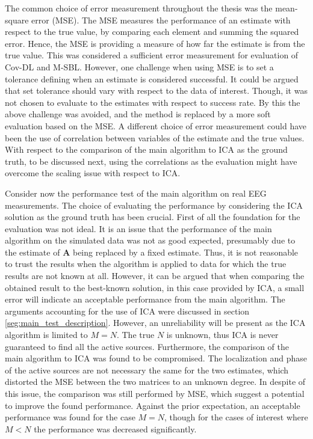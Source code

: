 The common choice of error measurement throughout the thesis was the mean-square error (MSE). 
The MSE measures the performance of an estimate with respect to the true value, by comparing each element and summing the squared error. 
Hence, the MSE is providing a measure of how far the estimate is from the true value. 
This was considered a sufficient error measurement for evaluation of Cov-DL and M-SBL.
However, one challenge when using MSE is to set a tolerance defining when an estimate is considered successful. 
It could be argued that set tolerance should vary with respect to the data of interest.
Though, it was not chosen to evaluate to the estimates with respect to success rate. By this the above challenge was avoided, and the method is replaced by a more soft evaluation based on the MSE. 
A different choice of error measurement could have been the use of correlation between variables of the estimate and the true values. With respect to the comparison of the main algorithm to ICA as the ground truth, to be discussed next, using the correlations as the evaluation might have overcome the scaling issue with respect to ICA.    

Consider now the performance test of the main algorithm on real EEG measurements. 
The choice of evaluating the performance by considering the ICA solution as the ground truth has been crucial. 
First of all the foundation for the evaluation was not ideal. 
It is an issue that the performance of the main algorithm on the simulated data was not as good expected, presumably due to the estimate of $\mathbf{A}$ being replaced by a fixed estimate. 
Thus, it is not reasonable to trust the results when the algorithm is applied to data for which the true results are not known at all. 
However, it can be argued that when comparing the obtained result to the best-known solution, in this case provided by ICA, a small error will indicate an acceptable performance from the main algorithm. 
The arguments accounting for the use of ICA were discussed in section \ref{seg:main_test_description}. 
However, an unreliability will be present as the ICA algorithm is limited to $M = N$. 
The true $N$ is unknown, thus ICA is never guaranteed to find all the active sources.
Furthermore, the comparison of the main algorithm to ICA was found to be compromised. 
The localization and phase of the active sources are not necessary the same for the two estimates, which distorted the MSE between the two matrices to an unknown degree.
In despite of this issue, the comparison was still performed by MSE, which suggest a potential to improve the found performance. 
Against the prior expectation, an acceptable performance was found for the case $M = N$, though for the cases of interest where $M < N$ the performance was decreased significantly.    

